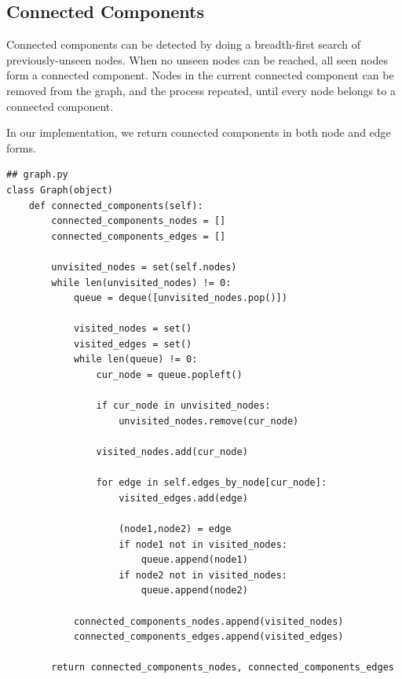 \documentclass{article}
\begin{document}
\subsection{Connected Components}
\begin{flushleft}

Connected components can be detected
by doing a breadth-first search
of previously-unseen nodes.
When no unseen nodes can be reached,
all seen nodes form a connected component.
Nodes in the current connected component
can be removed from the graph,
and the process repeated,
until every node belongs to a connected component.

In our implementation,
we return connected components
in both node and edge forms.

\begin{lstlisting}
## graph.py
class Graph(object)
    def connected_components(self):
        connected_components_nodes = []
        connected_components_edges = []

        unvisited_nodes = set(self.nodes)
        while len(unvisited_nodes) != 0:
            queue = deque([unvisited_nodes.pop()])

            visited_nodes = set()
            visited_edges = set()
            while len(queue) != 0:
                cur_node = queue.popleft()

                if cur_node in unvisited_nodes:
                    unvisited_nodes.remove(cur_node)

                visited_nodes.add(cur_node)

                for edge in self.edges_by_node[cur_node]:
                    visited_edges.add(edge)

                    (node1,node2) = edge
                    if node1 not in visited_nodes:
                        queue.append(node1)
                    if node2 not in visited_nodes:
                        queue.append(node2)

            connected_components_nodes.append(visited_nodes)
            connected_components_edges.append(visited_edges)

        return connected_components_nodes, connected_components_edges
\end{lstlisting}

\end{flushleft}
\end{document}
